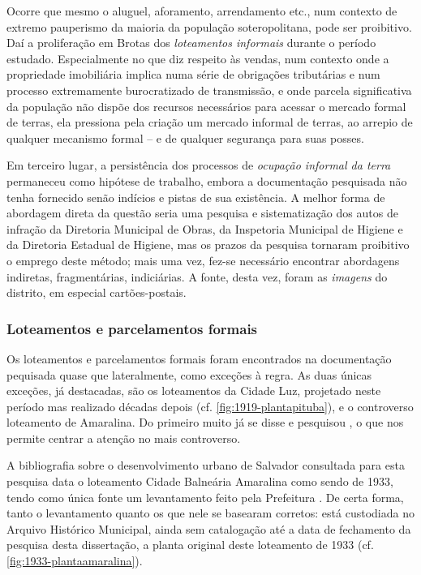 Ocorre que mesmo o aluguel, aforamento, arrendamento etc., num contexto de extremo pauperismo da maioria da população soteropolitana, pode ser proibitivo. Daí a proliferação em Brotas dos \textit{loteamentos informais} durante o período estudado. Especialmente no que diz respeito às vendas, num contexto onde a propriedade imobiliária implica numa série de obrigações tributárias e num processo extremamente burocratizado de transmissão, e onde parcela significativa da população não dispõe dos recursos necessários para acessar o mercado formal de terras, ela pressiona pela criação um mercado informal de terras, ao arrepio de qualquer mecanismo formal -- e de qualquer segurança para suas posses. 

Em terceiro lugar, a persistência dos processos de \textit{ocupação informal da terra} permaneceu como hipótese de trabalho, embora a documentação pesquisada não tenha fornecido senão indícios e pistas de sua existência. A melhor forma de abordagem direta da questão seria uma pesquisa e sistematização dos autos de infração da Diretoria Municipal de Obras, da Inspetoria Municipal de Higiene e da Diretoria Estadual de Higiene, mas os prazos da pesquisa tornaram proibitivo o emprego deste método; mais uma vez, fez-se necessário encontrar abordagens indiretas, fragmentárias, indiciárias. A fonte, desta vez, foram as \textit{imagens} do distrito, em especial cartões-postais.

\subsubsection{Loteamentos e parcelamentos formais}\label{subsubsec:lotparform}

Os loteamentos e parcelamentos formais foram encontrados na documentação pequisada quase que lateralmente, como exceções à regra. As duas únicas exceções, já destacadas, são os loteamentos da Cidade Luz, projetado neste período mas realizado décadas depois (cf. \autoref{fig:1919-plantapituba}), e o controverso loteamento de Amaralina. Do primeiro muito já se disse e pesquisou \cite{costa1996theodoro, fernandessampaiogomes1999, salvador_loteamentos_1977, santos_theodoro_2010}, o que nos permite centrar a atenção no mais controverso.

A bibliografia sobre o desenvolvimento urbano de Salvador consultada para esta pesquisa data o loteamento Cidade Balneária Amaralina como sendo de 1933, tendo como única fonte um levantamento feito pela Prefeitura \cite{salvador_loteamentos_1977}. De certa forma, tanto o levantamento quanto os que nele se basearam corretos: está custodiada no Arquivo Histórico Municipal, ainda sem catalogação até a data de fechamento da pesquisa desta dissertação, a planta original deste loteamento de 1933 (cf. \autoref{fig:1933-plantaamaralina}). 

